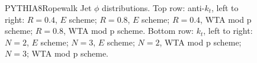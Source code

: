 \begin{figure}[H]
\hfill
{}\hfill
\caption{PYTHIA8Ropewalk Jet $\phi$ distributions. Top row: anti-$k_t$, left to right: $R=0.4$, $E$ scheme; $R=0.8$, $E$ scheme; $R=0.4$, WTA mod p scheme; $R=0.8$, WTA mod p scheme. Bottom row: $k_t$, left to right: $N=2$, $E$ scheme; $N=3$, $E$ scheme; $N=2$, WTA mod p scheme; $N=3$; WTA mod p scheme.}  
\end{figure}

